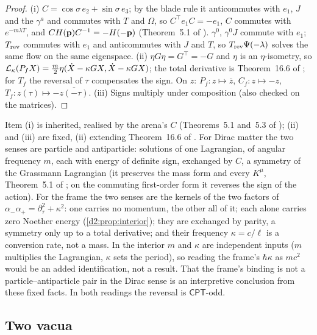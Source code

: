 \begin{proof}
(i) $C=\cos\sigma\,e_2+\sin\sigma\,e_3$; by the blade rule it anticommutes with $e_1$, $J$ and the $\gamma^a$ and commutes with $T$ and $\Omega$, so
$C^{\!\top}e_1C=-e_1$, $C$ commutes with $e^{-m\lambda T}$, and $CH(\mathbf p)C^{-1}=-H(-\mathbf p)$ (Theorem~5.1 of \cite{ES17}). $\gamma^0$, $\gamma^0J$ commute with
$e_1$; $T_{\rm rev}$ commutes with $e_1$ and anticommutes with $J$ and $T$, so $T_{\rm rev}\Psi(-\lambda)$ solves the same flow on the same eigenspace.
(ii) $\eta G\eta=G^{\!\top}=-G$ and $\eta$ is an $\eta$-isometry, so $\mathcal L_\kappa(P_fX)=\tfrac m2\eta(\dot X-\kappa GX,\dot X-\kappa GX)$; the total derivative
is Theorem~16.6 of \cite{ES17}; for $T_f$ the reversal of $\tau$ compensates the sign. On $z$: $P_f\colon z\mapsto\bar z$, $C_f\colon z\mapsto-z$,
$T_f\colon z(\tau)\mapsto-\overline{z(-\tau)}$. (iii) Signs multiply under composition (also checked on the matrices).
\end{proof}

Item (i) is inherited, realised by the arena's $C$ (Theorems~5.1 and~5.3 of \cite{ES17}); (ii) and (iii) are fixed, (ii) extending Theorem~16.6 of
\cite{ES17}. For Dirac matter the two senses are particle and antiparticle: solutions of one Lagrangian, of angular frequency $m$, each with energy
of definite sign, exchanged by $C$, a symmetry of the Grassmann Lagrangian (it preserves the mass form and every $K^\mu$, Theorem~5.1 of
\cite{ES17}; on the commuting first-order form it reverses the sign of the action). For the frame the two senses are the kernels of the two factors
of $\alpha_-\alpha_+=\partial_\tau^2+\kappa^2$: one carries no momentum, the other all of it; each alone carries zero Noether energy
(\cref{d2:prop:interior}); they are exchanged by parity, a symmetry only up to a total derivative; and their frequency $\kappa=c/\ell$ is a conversion
rate, not a mass. In the interior $m$ and $\kappa$ are independent inputs ($m$ multiplies the Lagrangian, $\kappa$ sets the period), so reading the
frame's $\hbar\kappa$ as $mc^2$ would be an added identification, not a result. That the frame's binding is not a particle--antiparticle pair in
the Dirac sense is an interpretive conclusion from these fixed facts. In both readings the reversal is $\mathsf{CPT}$-odd.

\subsection{Two vacua}
\label{d2:sec:vacua}

